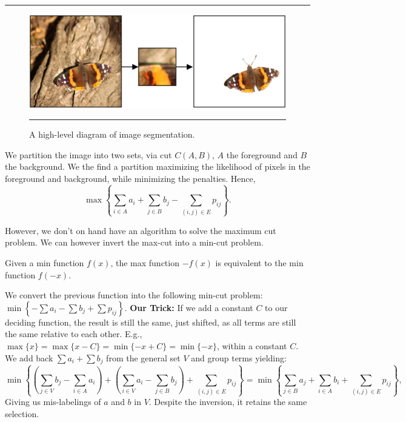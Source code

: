 \vspace{-1em}
\noindent\rule{\textwidth}{0.4pt}

\begin{figure}[h]
    \centering
    \includegraphics[width=.7\textwidth]{Sections/net/butterfly.png}
    \noindent\rule{\textwidth}{0.4pt}
    \caption{A high-level diagram of image segmentation.}
    \label{fig:butterfly}
\end{figure}

\noindent
We partition the image into two sets, via cut $C(A,B)$, $A$ the foreground and $B$ the background.
We the find a partition maximizing the likelihood of pixels in the foreground and background, while minimizing the penalties.
Hence, 
$$\displaystyle\max\left\{\sum_{i\in A} a_i + \sum_{j\in B} b_j - \sum_{(i,j)\in E} p_{ij}\right\}.$$

\noindent
However, we don't on hand have an algorithm to solve the maximum cut problem. We can however invert the max-cut into a min-cut problem.
\begin{theo}

    Given a min function $f(x)$, the max function $-f(x)$ is equivalent to the min function $f(-x)$.
\end{theo}
We convert the previous function into the following min-cut problem: 
$\displaystyle\min\left\{-\sum a_i - \sum b_j + \sum p_{ij}\right\}.$ 
\textbf{Our Trick:} If we add a constant $C$ to our deciding function, the result is still the same, just shifted,
as all terms are still the same relative to each other. E.g., $\max\{x\} = \max\{x-C\}= \min\{-x+C\}= \min\{-x\}$, within a constant $C$.
We add back $\sum a_i + \sum b_j$ from the general set $V$ and group terms yielding:
$$\min\left\{\left(\sum_{j\in V} b_j - \sum_{i\in A} a_i \right) + \left(\sum_{i\in V} a_i - \sum_{j\in B} b_j\right) + \sum_{(i,j)\in E} p_{ij}\right\}=
\min\left\{\sum_{j\in B} a_j + \sum_{i\in A} b_i + \sum_{(i,j)\in E} p_{ij}\right\},$$
Giving us mis-labelings of $a$ and $b$ in $V$. Despite the inversion, it retains the same selection.

\newpage

